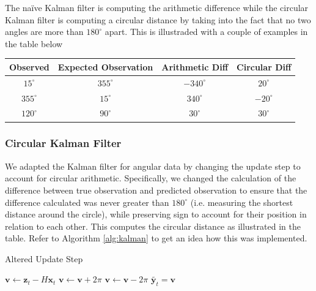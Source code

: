 \documentclass[11pt]{amsart}
\begin{document}
The naïve Kalman filter is computing the arithmetic difference while the circular Kalman filter is computing a circular distance by taking into the fact that no two angles are more than
$180^{\circ}$ apart. This is illustraded with a couple of examples in the table below

\begin{center}
    \begin{tabular}{||c c c c||}
     \hline
     Observed & Expected Observation & Arithmetic Diff & Circular Diff \\ 
     \hline\hline
     $15^{\circ}$ & $355^{\circ}$ & $-340^{\circ}$ & $20^{\circ}$ \\ 
     \hline
     $355^{\circ}$ & $15^{\circ}$ &  $340^{\circ}$ & $-20^{\circ}$ \\
     \hline
     $120^{\circ}$ & $90^{\circ}$ & $30^{\circ}$ & $30^{\circ}$ \\ [1ex] 
     \hline
    \end{tabular}
    \end{center}



\subsubsection{Circular Kalman Filter}
We adapted the Kalman filter for angular data by changing the update step to account for circular arithmetic. Specifically, we changed the calculation of the difference between true 
observation and predicted observation to ensure that the difference calculated was never greater than $180^{\circ}$ (i.e. measuring the shortest distance around the circle), while preserving 
sign to account for their position in relation to each other. This computes the circular distance as illustrated in the table. Refer to Algorithm \ref{alg:kalman} to get an idea how this was 
implemented.


\begin{algorithm}
    \caption{Altered Update Step}\label{alg:kalman}    
    \begin{algorithmic}
        \State $\mathbf{v} \gets \mathbf{z}_t - H\mathbf{x}_t$
            \State $\mathbf{v} \gets \mathbf{v} + 2\pi$
            \State $\mathbf{v} \gets \mathbf{v} - 2\pi$
        \EndIf 
        \State $\tilde{\mathbf{y}_t} = \mathbf{v}$ 
        \end{algorithmic}
    \end{algorithm}
\end{document}

